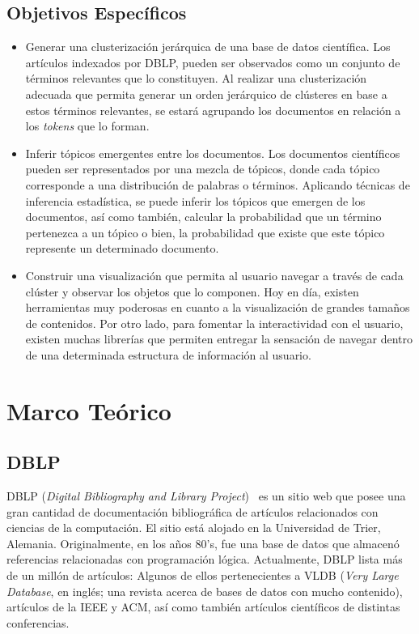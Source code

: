 \documentclass[12pt,oneside,letterpaper]{book}
\newcommand{\eng}[1]{\textit{#1}\xspace}			%
\newcommand{\abr}[1]{\textsc{#1}\xspace}           %
\theoremstyle{definition}
\begin{document}
\section{Objetivos Específicos}
\label{sec:objetivos_especificos}
\begin{itemize}
	\item Generar una clusterización jerárquica de una base de datos científica.
	Los artículos indexados por DBLP, pueden ser observados como un conjunto de términos relevantes que lo constituyen. Al realizar una clusterización adecuada que permita generar un orden jerárquico de clústeres en base a estos términos relevantes, se estará agrupando los documentos en relación a los \eng{tokens} que lo forman.

	\item Inferir tópicos emergentes entre los documentos.
	Los documentos científicos pueden ser representados por una mezcla de tópicos, donde cada tópico corresponde a una distribución de palabras o términos. Aplicando técnicas de inferencia estadística, se puede inferir los tópicos que emergen de los documentos, así como también, calcular la probabilidad que un término pertenezca a un tópico o bien, la probabilidad que existe que este tópico represente un determinado documento.

	\item Construir una visualización que permita al usuario navegar a través de cada clúster y observar los objetos que lo componen.
	Hoy en día, existen herramientas muy poderosas en cuanto a la visualización de grandes tamaños de contenidos. Por otro lado, para fomentar la interactividad con el usuario, existen muchas librerías que permiten entregar la sensación de navegar dentro de una determinada estructura de información al usuario.
\end{itemize}

\chapter{Marco Teórico}
\label{chap:marco_teorico}
\section{\abr{DBLP}}
\label{sec:dblp}
\abr{DBLP} (\eng{Digital Bibliography and Library Project})~\cite{DBLPLey2002} es un sitio web que posee una gran cantidad de documentación bibliográfica de artículos relacionados con ciencias de la computación. El sitio está alojado en la Universidad de Trier, Alemania. Originalmente, en los años 80's, fue una base de datos que almacenó referencias relacionadas con programación lógica. Actualmente, DBLP lista más de un millón de artículos: Algunos de ellos pertenecientes a \abr{VLDB} (\eng{Very Large Database}, en inglés; una revista acerca de bases de datos con mucho contenido), artículos de la \abr{IEEE} y \abr{ACM}, así como también artículos científicos de distintas conferencias.
\end{document}
